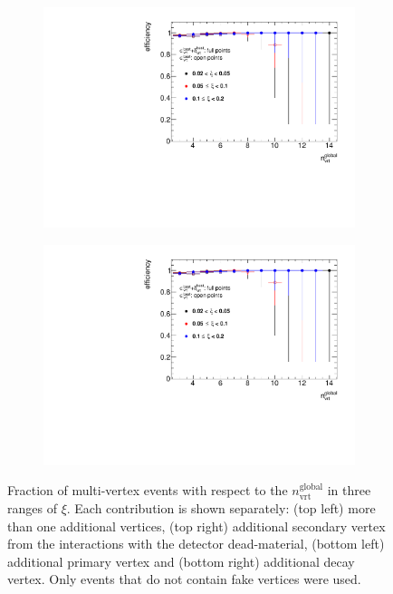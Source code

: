 \begin{figure}[h!]
\begin{subfigure}{.47\textwidth}
		\includegraphics[width=\textwidth,page=6]{chapters/chrgSTAR/img/vertex/vertexEffi_ksi_noFake.pdf}
	\end{subfigure}
	\begin{subfigure}{.47\textwidth}
		\includegraphics[width=\textwidth,page=7]{chapters/chrgSTAR/img/vertex/vertexEffi_ksi_noFake.pdf}
	\end{subfigure}
	\caption{Fraction of multi-vertex events  with respect to the $n_\textrm{vrt}^\textrm{global}$ in three ranges of $\xi$. Each contribution is shown separately: (top left) more than one additional vertices, (top right) additional secondary vertex from the interactions with the detector dead-material, (bottom left) additional primary vertex and (bottom right)  additional decay vertex. Only events that do not contain fake vertices were used.}
		\label{fig:vertexVeto_noFake}
\end{figure}

\FloatBarrier

